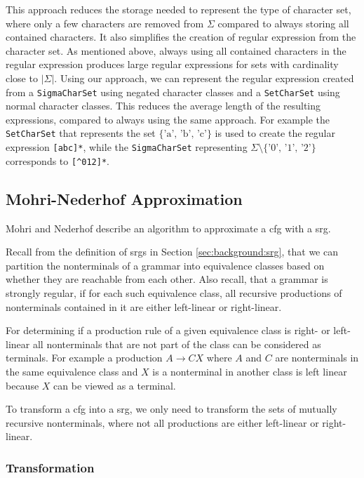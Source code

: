 This approach reduces the storage needed to represent the type of character set, where only a few characters are removed from $\Sigma$ compared to always storing all contained characters. It also simplifies the creation of regular expression from the character set. As mentioned above, always using all contained characters in the regular expression produces large regular expressions for sets with cardinality close to $|\Sigma|$. Using our approach, we can represent the regular expression created from a \lstinline|SigmaCharSet| using negated character classes and a \lstinline|SetCharSet| using normal character classes. This reduces the average length of the resulting expressions, compared to always using the same approach.
For example the \lstinline|SetCharSet| that represents the set $\{\text{'a', 'b', 'c'}\}$ is used to create the regular expression \lstinline|[abc]*|, while the \lstinline|SigmaCharSet| representing $\Sigma \setminus \{\text{'0', '1', '2'}\}$ corresponds to \lstinline|[^012]*|.

		
\subsection{Mohri-Nederhof Approximation}\label{sec:mohriNederhofApprox}


Mohri and Nederhof \cite{mohri_nederhof} describe an algorithm to approximate a \ac{cfg} with a \ac{srg}.

Recall from the definition of \acp{srg} in Section \ref{sec:background:srg}, that we can partition the nonterminals of a grammar into equivalence classes based on whether they are reachable from each other. Also recall, that a grammar is strongly regular, if for each such equivalence class, all recursive productions of nonterminals contained in it are either left-linear or right-linear.

For determining if a production rule of a given equivalence class is right- or left-linear all nonterminals that are not part of the class can be considered as terminals. For example a production $A \rightarrow CX$ where $A$ and $C$ are nonterminals in the same equivalence class and $X$ is a nonterminal in another class is left linear because $X$ can be viewed as a terminal.

To transform a \ac{cfg} into a \ac{srg}, we only need to transform the sets of mutually recursive nonterminals, where not all productions are either left-linear or right-linear.

\subsubsection{Transformation}

